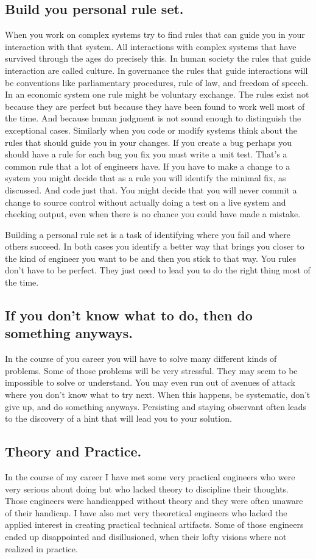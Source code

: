 \subsection{Build you personal rule set.}
When you work on complex systems try to find rules that can guide you in your interaction with that system. All interactions with complex systems
that have survived through the ages do precisely this. In human society the rules that guide interaction are called culture. In governance the
rules that guide interactions will be conventions like parliamentary procedures, rule of law, and freedom of speech. In an economic
system one rule might be voluntary exchange. The rules exist not because they are perfect but because they have been found to work well most
of the time. And because human judgment is not sound enough to distinguish the exceptional cases. Similarly when you code or modify systems think about the
rules that should guide you in your changes. If you create a bug perhaps you should have a rule for each bug you fix you must write a unit
test. That's a common rule that a lot of engineers have. If you have to make a change to a system you might decide that as a rule you will identify
the minimal fix, as discussed. And code just that. You might decide that you will never commit a change to source control without actually doing a
test on a live system and checking output, even when there is no chance you could have made a mistake.

Building a personal rule set is a task of identifying where you fail and where others succeed. In both cases you identify a better way that brings
you closer to the kind of engineer you want to be and then you stick to that way. You rules don't have to be perfect. They just need to lead you to do the
right thing most of the time. 

\subsection{If you don't know what to do, then do something anyways.}
In the course of you career you will have to solve many different kinds of problems. Some of those problems will be very stressful. They may
seem to be impossible to solve or understand. You may even run out of avenues of attack where you don't know what to try next. When this happens,
be systematic, don't give up, and do something anyways. Persisting and staying observant often leads to the discovery of a hint that will lead
you to your solution.

\subsection{Theory and Practice.}
In the course of my career I have met some very practical engineers who were very serious about doing but who lacked theory to
discipline their thoughts. Those engineers were handicapped without theory and they were often unaware of their handicap. I have also met very theoretical
engineers who lacked the applied interest in creating practical technical artifacts. Some of those engineers ended up disappointed and disillusioned,
when their lofty visions where not realized in practice.

